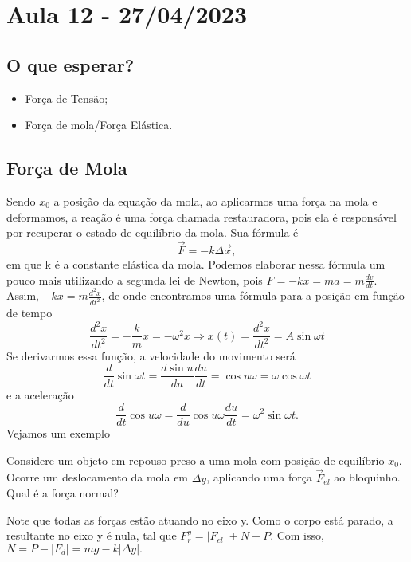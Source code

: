 \documentclass[PhysicsI/physics_notes.tex]{subfiles}
\begin{document}
\section{Aula 12 - 27/04/2023}
\subsection{O que esperar?}
\begin{itemize}
	\item Força de Tensão;
	\item Força de mola/Força Elástica.
\end{itemize}
\subsection{Força de Mola}
Sendo $x_{0}$ a posição da equação da mola, ao aplicarmos uma força na mola e deformamos, a reação
é uma força chamada restauradora, pois ela é responsável por recuperar o estado de equilíbrio da mola. Sua fórmula é
$$
	\vec{F} = -k\Delta \vec{x},
$$
em que k é a constante elástica da mola. Podemos elaborar nessa fórmula um pouco mais utilizando a segunda lei de Newton, pois
$F = -kx = ma = m \frac{dv}{dt}.$ Assim, $-kx = m \frac{d^{2}x}{dt^{2}}$, de onde encontramos uma fórmula para a posição em função de tempo
$$
	\frac{d^{2}x}{dt^{2}} = -\frac{k}{m}x = -\omega^{2}x \Rightarrow \boxed{x(t) = \frac{d^{2}x}{dt^{2}} = A\sin{\omega t}}
$$
Se derivarmos essa função, a velocidade do movimento será
$$
	\frac{d}{dt}\sin{\omega t} = \frac{d\sin{u}}{du}\frac{du}{dt} = \cos{u}\omega = \omega \cos{\omega t}
$$
e a aceleração
$$
	\frac{d}{dt}\cos{u} \omega = \frac{d}{du}\cos{u}\omega \frac{du}{dt} = \omega^{2}\sin{\omega t}.
$$
Vejamos um exemplo
\begin{example}
	Considere um objeto em repouso preso a uma mola com posição de equilíbrio $x_{0}$. Ocorre um
	deslocamento da mola em $\Delta y$, aplicando uma força $\vec{F}_{el}$ ao bloquinho. Qual é a força normal?

	Note que todas as forças estão atuando no eixo y. Como o corpo está parado, a resultante no eixo y é nula, tal que
	$F_{r}^{y} = |F_{el}| + N - P$. Com isso, $N = P - |F_{d}| = mg - k|\Delta y|.$
\end{example}
\end{document}
